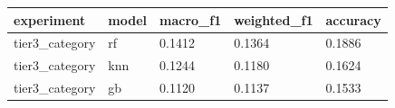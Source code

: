 \begin{tabular}{lllll}
\toprule
    experiment & model & macro\_f1 & weighted\_f1 & accuracy \\
\midrule
tier3\_category &    rf &   0.1412 &      0.1364 &   0.1886 \\
tier3\_category &   knn &   0.1244 &      0.1180 &   0.1624 \\
tier3\_category &    gb &   0.1120 &      0.1137 &   0.1533 \\
\bottomrule
\end{tabular}
